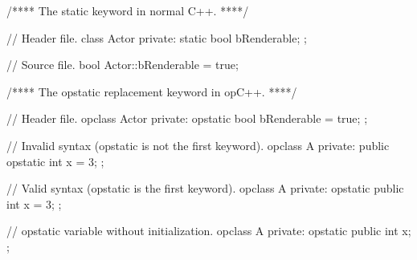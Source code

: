\begin{opcpp}[label={fig:opstatic1},caption={The \opcppK{opstatic} keyword.}]
/**** The static keyword in normal C++. ****/

// Header file.
class Actor
{
private:
	static bool bRenderable;
};

// Source file.
bool Actor::bRenderable = true;

/**** The opstatic replacement keyword in opC++. ****/ 

// Header file.
opclass Actor
{
private:
	opstatic bool bRenderable = true;
};
\end{opcpp}

\begin{opcpp}[label={fig:opstatic2},caption={The \opcppK{opstatic} keyword must come first in an \opcppK{opstatic} declaration.}]
// Invalid syntax (opstatic is not the first keyword).
opclass A
{
private:
	public opstatic int x = 3;
};

// Valid syntax (opstatic is the first keyword).
opclass A
{
private:
	opstatic public int x = 3;
};
\end{opcpp}

\begin{opcpp}[label={fig:opstatic3},caption={Declaring a variable \opcppK{opstatic} without initializing it.}]
// opstatic variable without initialization.
opclass A
{
private:
	opstatic public int x;
};
\end{opcpp}

